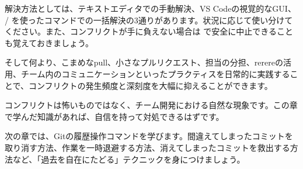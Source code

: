 解決方法としては、テキストエディタでの手動解決、VS Codeの視覚的なGUI、 /  を使ったコマンドでの一括解決の3通りがあります。状況に応じて使い分けてください。また、コンフリクトが手に負えない場合は  で安全に中止できることも覚えておきましょう。

そして何より、こまめなpull、小さなプルリクエスト、担当の分担、rerereの活用、チーム内のコミュニケーションといったプラクティスを日常的に実践することで、コンフリクトの発生頻度と深刻度を大幅に抑えることができます。

コンフリクトは怖いものではなく、チーム開発における自然な現象です。この章で学んだ知識があれば、自信を持って対処できるはずです。

次の章では、Gitの履歴操作コマンドを学びます。間違えてしまったコミットを取り消す方法、作業を一時退避する方法、消えてしまったコミットを救出する方法など、「過去を自在にたどる」テクニックを身につけましょう。
